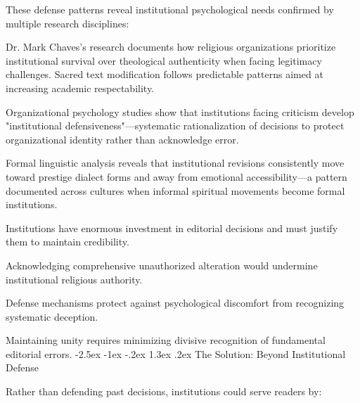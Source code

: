 \documentclass[12pt,twoside]{book}
\makeatletter
\renewcommand\section{\@startsection{section}{1}{\z@}%
{-2.5ex \@plus -1ex \@minus -.2ex}%
{1.3ex \@plus.2ex}%
{\normalfont\Large\bfseries}}
\makeatother
\begin{document}
These defense patterns reveal institutional psychological needs confirmed by multiple research disciplines:

Dr. Mark Chaves's research documents how religious organizations prioritize institutional survival over theological authenticity when facing legitimacy challenges. Sacred text modification follows predictable patterns aimed at increasing academic respectability.

Organizational psychology studies show that institutions facing criticism develop "institutional defensiveness"—systematic rationalization of decisions to protect organizational identity rather than acknowledge error.

Formal linguistic analysis reveals that institutional revisions consistently move toward prestige dialect forms and away from emotional accessibility—a pattern documented across cultures when informal spiritual movements become formal institutions.

Institutions have enormous investment in editorial decisions and must justify them to maintain credibility.

Acknowledging comprehensive unauthorized alteration would undermine institutional religious authority.

Defense mechanisms protect against psychological discomfort from recognizing systematic deception.

Maintaining unity requires minimizing divisive recognition of fundamental editorial errors.
\section{The Solution: Beyond Institutional Defense}
\label{sec:org09ffd8a}

Rather than defending past decisions, institutions could serve readers by:
\end{document}
